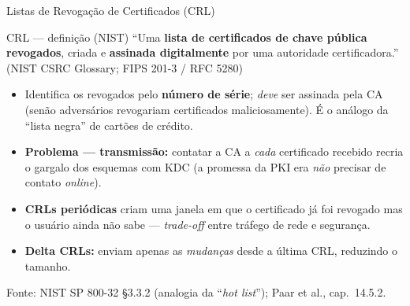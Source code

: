 \documentclass{beamer}
\begin{document}
\begin{frame}{Listas de Revogação de Certificados (CRL)}
    \begin{block}{CRL --- definição (NIST)}
        \footnotesize
        ``Uma \textbf{lista de certificados de chave pública revogados}, criada e \textbf{assinada digitalmente} por uma autoridade certificadora.''
        \hfill {\tiny (NIST CSRC Glossary; FIPS 201-3 / RFC 5280)}
    \end{block}
    \medskip
    \begin{itemize}
        \footnotesize
        \item Identifica os revogados pelo \textbf{número de série}; \emph{deve} ser assinada pela CA (senão adversários revogariam certificados maliciosamente). É o análogo da ``lista negra'' de cartões de crédito.
        \item \textbf{Problema --- transmissão:} contatar a CA a \emph{cada} certificado recebido recria o gargalo dos esquemas com KDC (a promessa da PKI era \emph{não} precisar de contato \textit{online}).
        \item \textbf{CRLs periódicas} criam uma janela em que o certificado já foi revogado mas o usuário ainda não sabe --- \emph{trade-off} entre tráfego de rede e segurança.
        \item \textbf{Delta CRLs:} enviam apenas as \emph{mudanças} desde a última CRL, reduzindo o tamanho.
    \end{itemize}
    \smallskip
    {\tiny Fonte: NIST SP 800-32 §3.3.2 (analogia da ``\textit{hot list}''); Paar et al., cap.\ 14.5.2.}
\end{frame}
\end{document}
